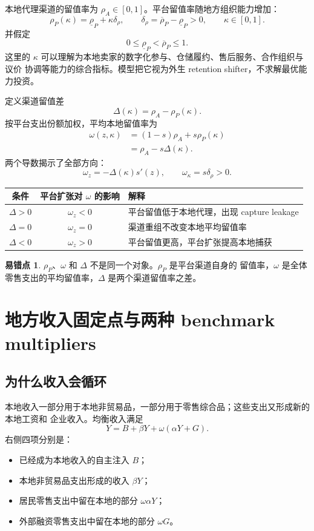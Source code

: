 \documentclass[UTF8,11pt,scheme=chinese,fontset=fandol]{ctexart}
\theoremstyle{definition}
\newtheorem{commonerror}{易错点}[section]
\begin{document}
本地代理渠道的留值率为 \(\rho_A\in[0,1]\)。平台留值率随地方组织能力增加：
\[
\rho_P(\kappa)=\underline\rho_P+\kappa\delta_\rho,
\qquad
\delta_\rho=\overline\rho_P-\underline\rho_P>0,
\qquad \kappa\in[0,1].
\]
并假定
\[
0\leq\underline\rho_P<\overline\rho_P\leq1.
\]
这里的 \(\kappa\) 可以理解为本地卖家的数字化参与、仓储履约、售后服务、合作组织与议价
协调等能力的综合指标。模型把它视为外生 retention shifter，不求解最优能力投资。

定义渠道留值差
\[
\Delta(\kappa)=\rho_A-\rho_P(\kappa).
\]
按平台支出份额加权，平均本地留值率为
\begin{align*}
\omega(z,\kappa)
&=(1-s)\rho_A+s\rho_P(\kappa)\\
&=\rho_A-s\Delta(\kappa).
\end{align*}
两个导数揭示了全部方向：
\[
\omega_z=-\Delta(\kappa)s'(z),
\qquad
\omega_\kappa=s\delta_\rho>0.
\]

\begin{center}
\begin{tabular}{ccl}
\toprule
条件 & 平台扩张对 \(\omega\) 的影响 & 解释 \\
\midrule
\(\Delta>0\) & \(\omega_z<0\) & 平台留值低于本地代理，出现 capture leakage \\
\(\Delta=0\) & \(\omega_z=0\) & 渠道重组不改变本地平均留值率 \\
\(\Delta<0\) & \(\omega_z>0\) & 平台留值更高，平台扩张提高本地捕获 \\
\bottomrule
\end{tabular}
\end{center}

\begin{commonerror}
\(\rho_P\)、\(\omega\) 和 \(\Delta\) 不是同一个对象。\(\rho_P\) 是平台渠道自身的
留值率，\(\omega\) 是全体零售支出的平均留值率，\(\Delta\) 是两个渠道留值率之差。
\end{commonerror}

\section{地方收入固定点与两种 benchmark multipliers}

\subsection{为什么收入会循环}

本地收入一部分用于本地非贸易品，一部分用于零售综合品；这些支出又形成新的本地工资和
企业收入。均衡收入满足
\[
\boxed{Y=B+\beta Y+\omega(\alpha Y+G).}
\]
右侧四项分别是：
\begin{itemize}
  \item 已经成为本地收入的自主注入 \(B\)；
  \item 本地非贸易品支出形成的收入 \(\beta Y\)；
  \item 居民零售支出中留在本地的部分 \(\omega\alpha Y\)；
  \item 外部融资零售支出中留在本地的部分 \(\omega G\)。
\end{itemize}
\end{document}
